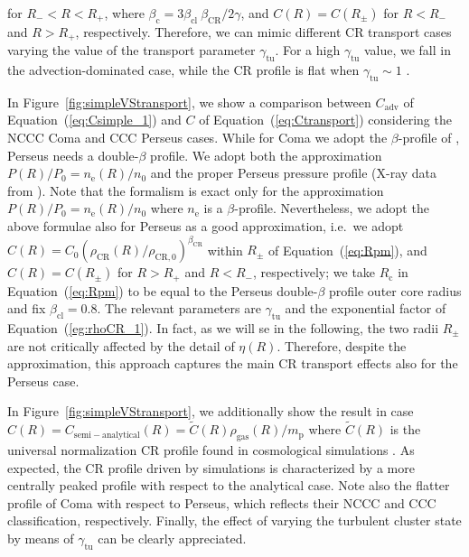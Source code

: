\documentclass[traditabstract]{aa}
\newcommand{\rmn}{\mathrm}
\begin{document}
\begin{appendix}
for $R_{-}<R<R_{+}$, where $\beta_{\rmn{c}}=3\beta_{\rmn{cl}}~\beta_{\rmn{CR}}/2\gamma$, 
and $C(R) = C(R_{\pm})$ for $R<R_{-}$ and $R>R_{+}$, respectively. Therefore, we can 
mimic different CR transport cases varying the value of the transport parameter 
$\gamma_{\rmn{tu}}$. For a high $\gamma_{\rmn{tu}}$ value, we fall in the 
advection-dominated case, while the CR profile is flat when $\gamma_{\rmn{tu}} \sim1$ \citep{2011A&A...527A..99E}. 

In Figure~\ref{fig:simpleVStransport}, we show a comparison between $C_{\rmn{adv}}$ of 
Equation~(\ref{eq:Csimple_1}) and $C$ of Equation~(\ref{eq:Ctransport}) considering the 
NCCC Coma and CCC Perseus cases. While for Coma we adopt the $\beta$-profile of 
\citet{1992A&A...259L..31B}, Perseus needs a double-$\beta$ profile. We adopt both the 
approximation $P(R)/P_{0}=n_{\rmn{e}}(R)/n_{0}$ and the proper Perseus pressure profile 
(X-ray data from \citealp{2003ApJ...590..225C}). Note that the \cite{2011A&A...527A..99E} 
formalism is exact only for the approximation $P(R)/P_{0}=n_{\rmn{e}}(R)/n_{0}$ where $n_{\rmn{e}}$ 
is a $\beta$-profile. Nevertheless, we adopt the above formulae also for Perseus as a good approximation, 
i.e.~we adopt $C(R)=C_{0}(\rho_{\rmn{CR}}(R)/\rho_{\rmn{CR},0})^{\beta_{\rmn{CR}}}$
within $R_{\pm}$ of Equation~(\ref{eq:Rpm}), and $C(R) = C(R_{\pm})$ for $R > R_{+}$ 
and $R < R_{-}$, respectively; we take $R_{\rmn{c}}$ in Equation~(\ref{eq:Rpm}) to be equal to the Perseus 
double-$\beta$ profile outer core radius and fix $\beta_{\rmn{cl}}=0.8$. The relevant 
parameters are $\gamma_{\rmn{tu}}$ and the exponential factor of Equation~(\ref{eg:rhoCR_1}). 
In fact, as we will se in the following, the two radii $R_{\pm}$ are not critically affected 
by the detail of $\eta(R)$. Therefore, despite the approximation, this approach captures the 
main CR transport effects also for the Perseus case. 

In Figure~\ref{fig:simpleVStransport}, we additionally show the result in case 
$C(R)=C_{\rmn{semi-analytical}}(R)=\tilde{C}(R)\rho_{\rmn{\rmn{gas}}}(R)/m_{\rmn{p}}$ 
where $\tilde{C}(R)$ is the universal normalization CR profile found in cosmological 
simulations \citep{2010MNRAS.409..449P}. As expected, the CR profile driven by 
simulations is characterized by a more centrally peaked profile with respect to the 
analytical case. Note also the flatter profile of Coma with respect to Perseus, which 
reflects their NCCC and CCC classification, respectively. Finally, the effect of varying 
the turbulent cluster state by means of $\gamma_{\rmn{tu}}$ can be clearly appreciated.


\end{appendix}
\end{document}
